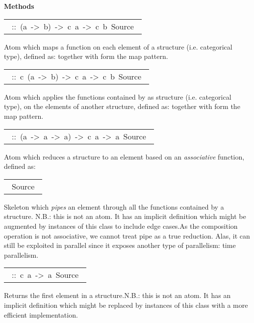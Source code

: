 \begin{haddockdesc}
\haddockpremethods{}\textbf{Methods}
\begin{haddockdesc}
\item[\begin{tabular}{@{}l}\haddockid{(=.=)}\ ::\ (a\ ->\ b)\ ->\ c\ a\ ->\ c\ b\ Source\ \end{tabular}]
\haddockbegindoc
Atom which maps a function on each element of a structure (i.e. categorical type), defined as: together with \haddockid{=*=} form the map pattern.\par

\item[\begin{tabular}{@{}l}\haddockid{(=*=)}\ ::\ c\ (a\ ->\ b)\ ->\ c\ a\ ->\ c\ b\ Source\ \end{tabular}]
\haddockbegindoc
Atom which applies the functions contained by as structure (i.e. categorical type), on the elements of another structure, defined as: together with \haddockid{=*=} form the map pattern.\par

\item[\begin{tabular}{@{}l}\haddockid{(=\=)}\ ::\ (a\ ->\ a\ ->\ a)\ ->\ c\ a\ ->\ a\ Source\ \end{tabular}]
\haddockbegindoc
Atom which reduces a structure to an element based on an \emph{associative} function, defined as:\par

\item[\begin{tabular}{@{}l}\haddockid{(=<<=)}\ Source\ \end{tabular}]
\haddockbegindoc
Skeleton which \emph{pipes} an element through all the functions contained by a structure. N.B.: this is not an atom. It has an implicit definition which might be augmented by instances of this class to include edge cases.As the composition operation is not associative, we cannot treat pipe as a true reduction. Alas, it can still be exploited in parallel since it exposes another type of parallelism: time parallelism.\par

\item[\begin{tabular}{@{}l}\haddockid{first}\ ::\ c\ a\ ->\ a\ Source\ \end{tabular}]
\haddockbegindoc
Returns the first element in a structure.N.B.: this is not an atom. It has an implicit definition which might be replaced by instances of this class with a more efficient implementation.\par


\end{haddockdesc}
\end{haddockdesc}
